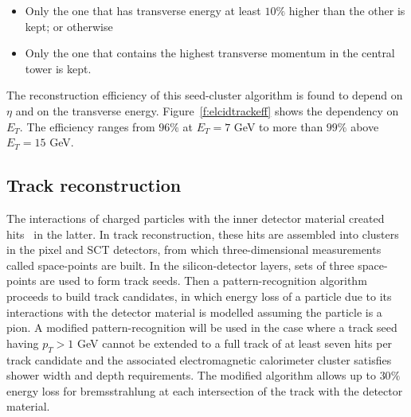 \begin{itemize}

	\item Only the one that has transverse energy at least $10\%$ higher than the
	      other is kept; or otherwise

	\item Only the one that contains the highest transverse momentum in the central
	      tower is kept.

\end{itemize}

The reconstruction efficiency of this seed-cluster algorithm is found to depend
on $\eta$ and on the transverse energy. Figure~\ref{f:elcidtrackeff} shows the
dependency on $E_T$. The efficiency ranges from $96\%$ at $E_T = 7$ GeV to more
than $99\%$ above $E_T = 15$ GeV.






\subsection{Track reconstruction}

The interactions of charged particles with the inner detector material created
hits~\cite{eltrackhits} in the latter. In track reconstruction, these hits are
assembled into clusters in the pixel and SCT detectors, from which
three-dimensional measurements called space-points are built. In the
silicon-detector layers, sets of three space-points are used to form track
seeds. Then a pattern-recognition algorithm proceeds to build track candidates,
in which energy loss of a particle due to its interactions with the detector
material is modelled assuming the particle is a pion. A modified
pattern-recognition will be used in the case where a track seed having $p_T >
	1$ GeV cannot be extended to a full track of at least seven hits per track
candidate and the associated electromagnetic calorimeter cluster satisfies
shower width and depth requirements. The modified algorithm allows up to $30\%$
energy loss for bremsstrahlung at each intersection of the track with the
detector material.

